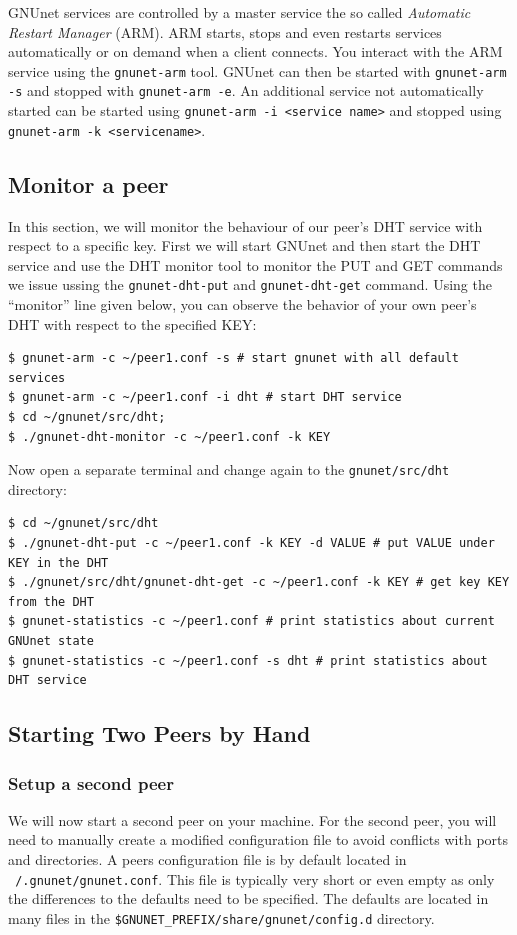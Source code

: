 \documentclass[10pt]{article}
\begin{document}
GNUnet services are controlled by a master service the so called \textit{Automatic Restart Manager} (ARM).
ARM starts, stops and even restarts services automatically or on demand when a client connects.
You interact with the ARM service using the \lstinline|gnunet-arm| tool.
GNUnet can then be started with \lstinline|gnunet-arm -s| and stopped with
\lstinline|gnunet-arm -e|.  An additional service not automatically started
can be started using \lstinline|gnunet-arm -i <service name>| and stopped
using \lstinline|gnunet-arm -k <servicename>|.

\subsection{Monitor a peer}
In this section, we will monitor the behaviour of our peer's DHT service with respect to a
specific key. First we will start GNUnet and then start the DHT service and use the DHT monitor tool
to monitor the PUT and GET commands we issue ussing the \lstinline|gnunet-dht-put| and
\lstinline|gnunet-dht-get| command. Using the ``monitor'' line given below, you can observe the behavior of
your own peer's DHT with respect to the specified KEY:

\lstset{language=bash}
\begin{lstlisting}
$ gnunet-arm -c ~/peer1.conf -s # start gnunet with all default services
$ gnunet-arm -c ~/peer1.conf -i dht # start DHT service
$ cd ~/gnunet/src/dht;
$ ./gnunet-dht-monitor -c ~/peer1.conf -k KEY
\end{lstlisting}
Now open a separate terminal and change again to the \lstinline|gnunet/src/dht| directory:
\begin{lstlisting}
$ cd ~/gnunet/src/dht
$ ./gnunet-dht-put -c ~/peer1.conf -k KEY -d VALUE # put VALUE under KEY in the DHT
$ ./gnunet/src/dht/gnunet-dht-get -c ~/peer1.conf -k KEY # get key KEY from the DHT
$ gnunet-statistics -c ~/peer1.conf # print statistics about current GNUnet state
$ gnunet-statistics -c ~/peer1.conf -s dht # print statistics about DHT service
\end{lstlisting}
\subsection{Starting Two Peers by Hand}
\subsubsection{Setup a second peer}
We will now start a second peer on your machine.
For the second peer, you will need to manually create a modified
configuration file to avoid conflicts with ports and directories.
A peers configuration file is by default located in {\tt ~/.gnunet/gnunet.conf}.
This file is typically very short or even empty as only the differences to the
defaults need to be specified.  The defaults are located in
many files in the {\tt \$GNUNET\_PREFIX/share/gnunet/config.d} directory.
\end{document}
